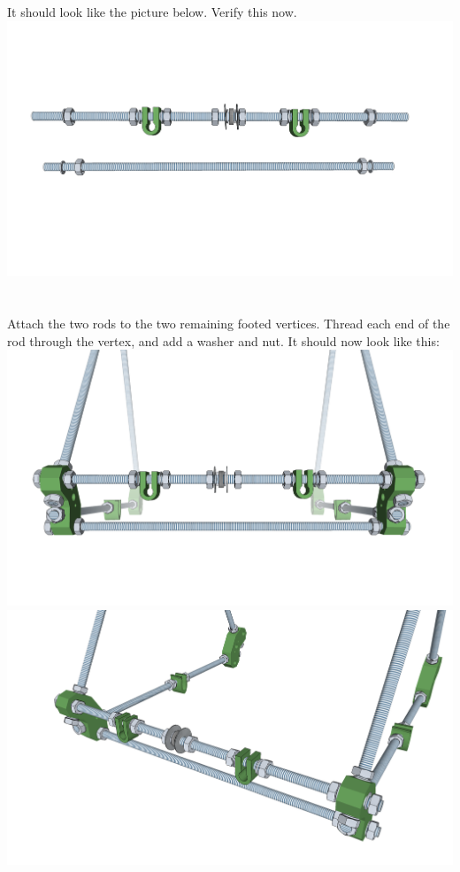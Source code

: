 \documentclass[twoside,openany,a4paper,titlepage]{memoir}
\begin{document}
	\section{}
	It should look like the picture below. Verify this now.\\
	\includegraphics[width=1\linewidth]{graphics/ch3_3.png}
	
	\section{}
	Attach the two rods to the two remaining footed vertices. Thread each end of the rod through the vertex,
	and add a washer and nut. It should now look like this:
	\includegraphics[width=1\linewidth]{graphics/ch3_4_1.png}
	\includegraphics[width=1\linewidth]{graphics/ch3_4_2.png}
	
\end{document}
